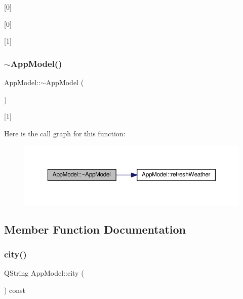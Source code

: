 \mbox{[}0\mbox{]} 

\mbox{[}0\mbox{]}

\mbox{[}1\mbox{]} \mbox{\label{class_app_model_a67ab3004ccbe2822a8a0abb9fa96ace3}} 
\subsubsection{\texorpdfstring{$\sim$\+App\+Model()}{~AppModel()}}
{\footnotesize\ttfamily App\+Model\+::$\sim$\+App\+Model (\begin{DoxyParamCaption}{ }\end{DoxyParamCaption})}



\mbox{[}1\mbox{]} 

Here is the call graph for this function\+:\nopagebreak
\begin{figure}[H]
\begin{center}
\leavevmode
\includegraphics[width=350pt]{class_app_model_a67ab3004ccbe2822a8a0abb9fa96ace3_cgraph}
\end{center}
\end{figure}


\subsection{Member Function Documentation}
\mbox{\label{class_app_model_a093066c81b5fe2c1361df8fd19a21f51}} 
\subsubsection{\texorpdfstring{city()}{city()}}
{\footnotesize\ttfamily Q\+String App\+Model\+::city (\begin{DoxyParamCaption}{ }\end{DoxyParamCaption}) const}

